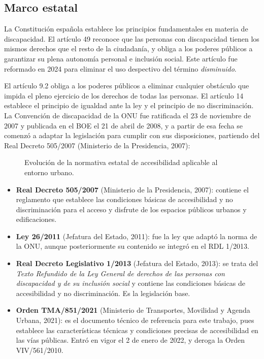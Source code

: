 \subsection{Marco estatal}

La Constitución española establece los principios fundamentales en materia de discapacidad. El artículo 49 reconoce que las personas con discapacidad tienen los mismos derechos que el resto de la ciudadanía, y obliga a los poderes públicos a garantizar su plena autonomía personal e inclusión social. Este artículo fue reformado en 2024 para eliminar el uso despectivo del término \textit{disminuido}.

El artículo 9.2 obliga a los poderes públicos a eliminar cualquier obstáculo que impida el pleno ejercicio de los derechos de todas las personas. El artículo 14 establece el principio de igualdad ante la ley y el principio de no discriminación.
\\

La Convención de discapacidad de la ONU fue ratificada el 23 de noviembre de 2007 y publicada en el BOE el 21 de abril de 2008, y a partir de esa fecha se comenzó a adaptar la legislación para cumplir con sus disposiciones, partiendo del Real Decreto 505/2007 (Ministerio de la Presidencia, 2007):

\begin{figure}[htbp]
\centering
  
\caption[Evolución de la normativa estatal de accesibilidad aplicable al entorno urbano]{Evolución de la normativa estatal de accesibilidad aplicable al entorno urbano.}
\label{fig:normativa_estatal}
\end{figure}

\begin{itemize}
    \item \textbf{Real Decreto 505/2007} (Ministerio de la Presidencia, 2007): contiene el reglamento que establece las condiciones básicas de accesibilidad y no discriminación para el acceso y disfrute de los espacios públicos urbanos y edificaciones.
    \item \textbf{Ley 26/2011} (Jefatura del Estado, 2011): fue la ley que adaptó la norma de la ONU, aunque posteriormente su contenido se integró en el RDL 1/2013.
    \item \textbf{Real Decreto Legislativo 1/2013} (Jefatura del Estado, 2013): se trata del \textit{Texto Refundido de la Ley General de derechos de las personas con discapacidad y de su inclusión social} y contiene las condiciones básicas de accesibilidad y no discriminación. Es la legislación base.
    \item \textbf{Orden TMA/851/2021} (Ministerio de Transportes, Movilidad y Agenda Urbana, 2021): es el documento técnico de referencia para este trabajo, pues establece las características técnicas y condiciones precisas de accesibilidad en las vías públicas. Entró en vigor el 2 de enero de 2022, y deroga la Orden VIV/561/2010.
\end{itemize}


